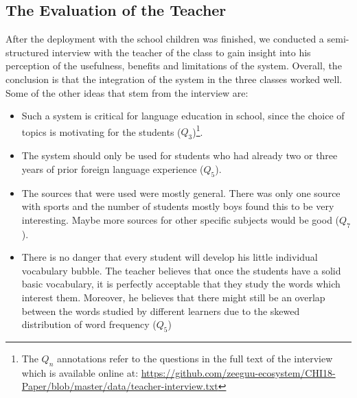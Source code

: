 
\newcommand{\q}[1]{($Q_#1$)}

\subsection{The Evaluation of the Teacher}
After the deployment with the school children was finished, we conducted a semi-structured interview with the teacher of the class to gain insight into his perception of the usefulness, benefits and limitations of the system. Overall, the conclusion is that the integration of the system in the three classes worked well. Some of the other ideas that stem from the interview are: 

\begin{itemize}

	\item Such a system is critical for language education in school, since the choice of topics is motivating for the students \q{3}\footnote{The $Q_n$ annotations refer to the questions in the full text of the interview which is available online at: \url{https://github.com/zeeguu-ecosystem/CHI18-Paper/blob/master/data/teacher-interview.txt}}. 

	\item The system should only be used for students who had already two or three years of prior foreign language experience \q{5}. 

	\item The sources that were used were mostly general. There was only one source with sports and the number of students mostly boys found this to be very interesting. Maybe more sources for other specific subjects would be good \q{7}.


	\item There is no danger that every student will develop his little individual vocabulary bubble. The teacher believes that once the students have a solid basic vocabulary, it is perfectly acceptable that they study the words which interest them. Moreover, he believes that there might still be an overlap between the words studied by different learners due to the skewed distribution of word frequency \q{5}


\end{itemize}
